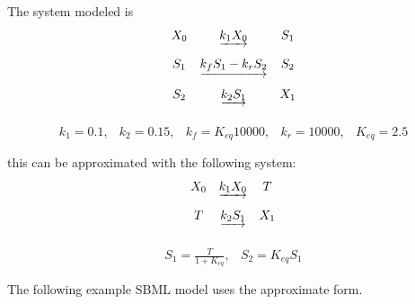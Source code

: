 \documentclass[10pt,twocolumntoc]{cekarticle}
\newcommand{\D}{\displaystyle}
\begin{document}
The system modeled is
\begin{equation*}
  \begin{array}{@{}ccc@{}}
    X_0 & \underrightarrow{k_1 X_0} & S_1 \\ \\[-4pt]
    S_1 & \underrightarrow{k_f S_1 - k_r S_2} & S_2 \\ \\[-4pt]
    S_2 & \underrightarrow{k_2 S_1} & X_1\\ \\[-4pt]
  \end{array}
\end{equation*}
\begin{equation*}
  \begin{array}{lllll}
    k_1 = 0.1, & k_2 = 0.15, & k_f = K_{eq} 10000, & k_r = 10000, & K_{eq} = 2.5\\ \\[-4pt]
  \end{array}
\end{equation*}
this can be approximated with the following system:
\begin{equation*}
  \begin{array}{@{}ccc@{}}
    X_0 & \underrightarrow{k_1 X_0} & T \\ \\[-4pt]
    T & \underrightarrow{k_2 S_1} & X_1\\ \\[-4pt]
  \end{array}
\end{equation*}
\begin{equation*}
  \begin{array}{ll}
    S_1 = \D\frac{T}{1 + K_{eq}}, & S_2 = K_{eq} S_1\\ \\[-4pt]
  \end{array}
\end{equation*}
The following example SBML model uses the approximate form.
\end{document}
